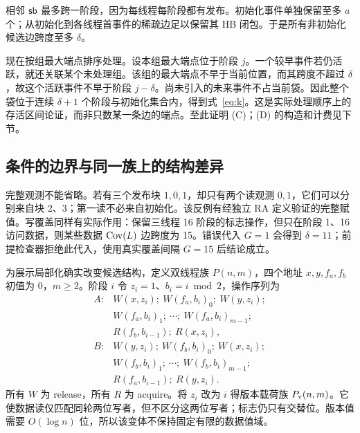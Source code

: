 相邻 $\mathsf{sb}$ 最多跨一阶段，因为每线程每阶段都有发布。初始化事件单独保留至多 $a$ 个；从初始化到各线程首事件的稀疏边足以保留其 HB 闭包。于是所有非初始化候选边跨度至多 $\delta$。

现在按组最大端点排序处理。设本组最大端点位于阶段 $j$。一个较早事件若仍活跃，就还关联某个未处理组。该组的最大端点不早于当前位置，而其跨度不超过 $\delta$，故这个活跃事件不早于阶段 $j-\delta$。尚未引入的未来事件不占当前袋。因此整个袋位于连续 $\delta+1$ 个阶段与初始化集合内，得到式~\eqref{eq:k}。这是实际处理顺序上的存活区间论证，而非只数某一条边的端点。至此证明 (C)；(D) 的构造和计费见下节。

\subsection{条件的边界与同一族上的结构差异}\label{sec:separation}
完整观测不能省略。若有三个发布块 $1,0,1$，却只有两个读观测 $0,1$，它们可以分别来自块 2、3；第一读不必来自初始化。该反例有经独立 RA 定义验证的完整赋值。写覆盖同样有实际作用：保留三线程 16 阶段的标志操作，但只在阶段 1、16 访问数据，则某些数据 $\mathop{\mathrm{Cov}}(L)$ 边跨度为 15。错误代入 $G=1$ 会得到 $\delta=11$；前提检查器拒绝此代入，使用真实覆盖间隔 $G=15$ 后结论成立。

为展示局部化确实改变候选结构，定义双线程族 $P(n,m)$，四个地址 $x,y,f_a,f_b$ 初值为 0，$m\ge2$。阶段 $i$ 令 $z_i=1$、$b_i=i\bmod2$，操作序列为
\begin{align*}
A: &W(x,z_i);\ W(f_a,b_i)_{0};\ W(y,z_i);\\
 &W(f_a,b_i)_{1};\ \cdots;\ W(f_a,b_i)_{m-1};\\
 &R(f_b,b_{i-1});\ R(x,z_i),\\
B: &W(y,z_i);\ W(f_b,b_i)_{0};\ W(x,z_i);\\
 &W(f_b,b_i)_{1};\ \cdots;\ W(f_b,b_i)_{m-1};\\
 &R(f_a,b_{i-1});\ R(y,z_i).
\end{align*}
所有 $W$ 为 release，所有 $R$ 为 acquire。将 $z_i$ 改为 $i$ 得版本载荷族 $P_{\mathrm v}(n,m)$。它使数据读仅匹配同轮两位写者，但不区分这两位写者；标志仍只有交替位。版本值需要 $O(\log n)$ 位，所以该变体不保持固定有限的数据值域。

